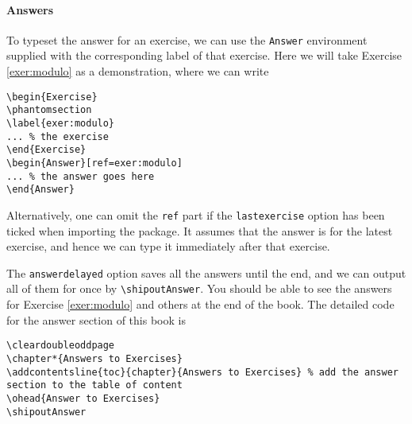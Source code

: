 \paragraph{Answers}
To typeset the answer for an exercise, we can use the \texttt{Answer} environment supplied with the corresponding label of that exercise. Here we will take Exercise \ref{exer:modulo} as a demonstration, where we can write
\begin{lstlisting}
\begin{Exercise}
\phantomsection
\label{exer:modulo}
... % the exercise
\end{Exercise}
\begin{Answer}[ref=exer:modulo]
... % the answer goes here
\end{Answer}
\end{lstlisting}
Alternatively, one can omit the \texttt{ref} part if the \texttt{lastexercise} option has been ticked when importing the package. It assumes that the answer is for the latest exercise, and hence we can type it immediately after that exercise.

The \texttt{answerdelayed} option saves all the answers until the end, and we can output all of them for once by \texttt{\textbackslash shipoutAnswer}. You should be able to see the answers for Exercise \ref{exer:modulo} and others at the end of the book. The detailed code for the answer section of this book is
\begin{lstlisting}
\cleardoubleoddpage
\chapter*{Answers to Exercises}
\addcontentsline{toc}{chapter}{Answers to Exercises} % add the answer section to the table of content
\ohead{Answer to Exercises}
\shipoutAnswer
\end{lstlisting}

